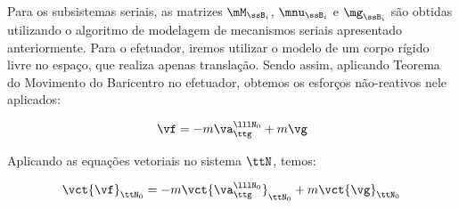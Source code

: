 \documentclass[]{politex}
\begin{document}
Para os subsistemas seriais, as matrizes $\mM_{\ssB_i}$, $\mnu_{\ssB_i}$ e $\mg_{\ssB_i}$ são obtidas utilizando o algoritmo de modelagem de mecanismos seriais apresentado anteriormente. Para o efetuador, iremos utilizar o modelo de um corpo rígido livre no espaço, que realiza apenas translação. Sendo assim, aplicando Teorema do Movimento do Baricentro no efetuador, obtemos os esforços não-reativos  nele aplicados:


\begin{equation} \label{eq:Newton-EulerE}
\vf = -m \va^{\lllN_0}_{\ttg} + m \vg
\end{equation}


Aplicando as equações vetoriais no sistema $\ttN$, temos:

\begin{equation} \label{eq:Newton-EulerMatE}
\vct{\vf}_{\ttN_0} = -m \vct{\va^{\lllN_0}_{\ttg}}_{\ttN_0}  +m \vct{\vg}_{\ttN_0}
\end{equation}
\end{document}
